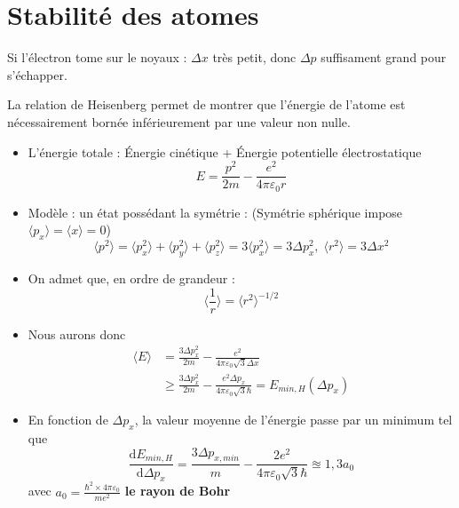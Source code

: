 


\newpage
\section{Stabilité des atomes} %
Si l'électron tome sur le noyaux : $\Delta x$ très petit, donc $\Delta p$ suffisament grand pour s'échapper.

La relation de Heisenberg permet de montrer que l'énergie de l'atome est nécessairement bornée inférieurement par une valeur non nulle. 

\begin{itemize}

    \item L'énergie totale : Énergie cinétique + Énergie potentielle électrostatique 
      \begin{equation}
        E = \frac{p ^{2}}{2m}  - \frac{e ^{2}}{4 \pi \varepsilon_0 r} 
      \end{equation}

    \item Modèle : un état possédant la symétrie : (Symétrie sphérique impose $\langle p_x \rangle= \langle x \rangle = 0$)
      \begin{equation}
        \langle p ^{2} \rangle = \langle p_x ^{2}\rangle + \langle p_y ^{2} \rangle + \langle p_z ^{2} \rangle = 3 \langle p_x ^{2} \rangle = 3 \Delta p_x ^{2},\; \langle r ^{2} \rangle = 3 \Delta x ^{2}
      \end{equation}


    \item On admet que, en ordre de grandeur : 
      \begin{equation}
        \langle \frac{1}{r}   \rangle = \langle r ^{2} \rangle ^{-1 /2} 
      \end{equation}

    \item Nous aurons donc 
      \begin{align}
        \langle E \rangle &= \frac{3 \Delta p _x ^{2}}{2m}  - \frac{
          e ^{2}
        }{4 \pi \varepsilon_0 \sqrt{3} \Delta x} \\ 
                          &\ge \frac{3 \Delta p_x ^{2}}{2m}  - \frac{e ^{2} \Delta p_x}{4 \pi \varepsilon_0 \sqrt{3} \hbar}  = E _{min,H}( \Delta p_x)
      \end{align}

    \item En fonction de $\Delta p_x$, la valeur moyenne de l'énergie passe par un minimum tel que 
      \begin{equation}
        \frac{\mathrm{d} E _{min, H}}{\mathrm{d} \Delta p_x}  = \frac{3 \Delta p _{x, min}}{m}  - \frac{2 e ^{2}}{ 4 \pi \varepsilon_0 \sqrt{3} \hbar}  \approxeq 1,3 a_0
      \end{equation}
      avec $a_0 = \frac{\hbar ^{2} \times 4 \pi \varepsilon_0}{ m e ^{2}}$ \textbf{le rayon de Bohr}


\end{itemize}
